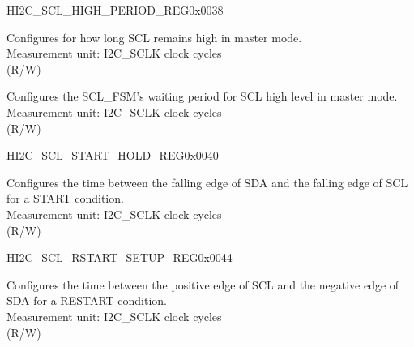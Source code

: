 \begin{register}{H}{I2C\_SCL\_HIGH\_PERIOD\_REG}{0x0038}\label{regdesc:I2CSCLHIGHPERIODREG}
%
%
%
\regnewline%
\begin{regdesc}\begin{reglist}
\label{fielddesc:I2CSCLHIGHPERIOD}\item [I2C\_SCL\_HIGH\_PERIOD] Configures for how long SCL remains high in master mode.\\
Measurement unit: I2C\_SCLK clock cycles \\ (R/W)
\label{fielddesc:I2CSCLWAITHIGHPERIOD}\item [I2C\_SCL\_WAIT\_HIGH\_PERIOD] Configures the SCL\_FSM's waiting period for SCL high level in master mode.\\
Measurement unit: I2C\_SCLK clock cycles \\ (R/W)
\end{reglist}\end{regdesc}
\end{register}


\begin{register}{H}{I2C\_SCL\_START\_HOLD\_REG}{0x0040}\label{regdesc:I2CSCLSTARTHOLDREG}
%
%
\regnewline%
\begin{regdesc}\begin{reglist}
\label{fielddesc:I2CSCLSTARTHOLDTIME}\item [I2C\_SCL\_START\_HOLD\_TIME] Configures the time between the falling edge of SDA and the falling edge of SCL for a START condition.\\
Measurement unit: I2C\_SCLK clock cycles \\ (R/W)
\end{reglist}\end{regdesc}
\end{register}


\begin{register}{H}{I2C\_SCL\_RSTART\_SETUP\_REG}{0x0044}\label{regdesc:I2CSCLRSTARTSETUPREG}
%
%
\regnewline%
\begin{regdesc}\begin{reglist}
\label{fielddesc:I2CSCLRSTARTSETUPTIME}\item [I2C\_SCL\_RSTART\_SETUP\_TIME] Configures the time between the positive edge of SCL and the negative edge of SDA for a RESTART condition.\\
Measurement unit: I2C\_SCLK clock cycles \\ (R/W)
\end{reglist}\end{regdesc}
\end{register}


